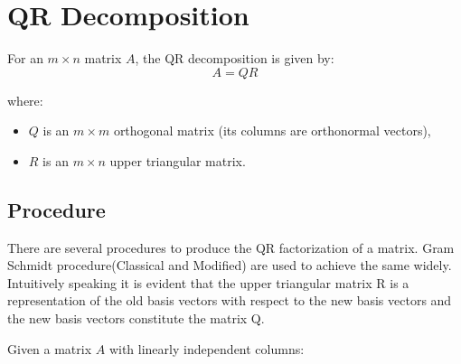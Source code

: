 \section{QR Decomposition}

For an $m \times n$ matrix $A$, the QR decomposition is given by:
\[ A = QR \]

where:
\begin{itemize}
    \item $Q$ is an $m \times m$ orthogonal matrix (its columns are orthonormal vectors),
    \item $R$ is an $m \times n$ upper triangular matrix.
\end{itemize}



\subsection{Procedure}
There are several procedures to produce the QR factorization of a matrix. Gram Schmidt procedure(Classical and Modified) are used to achieve the same widely. Intuitively speaking it is evident that the upper triangular matrix R is a representation of the old basis vectors with respect to the new basis vectors and the new basis vectors constitute the matrix Q.

Given a matrix $A$ with linearly independent columns:

